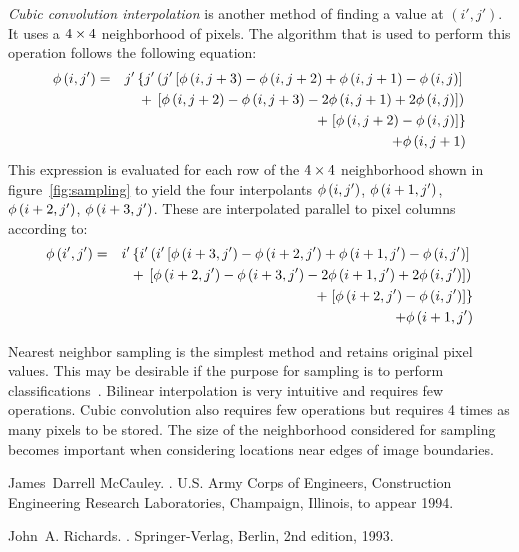 {\em Cubic convolution interpolation\/} is another method of finding
a value at $\left(i',j'\right).$ It uses a $4\times4\/$ neighborhood 
of pixels. The algorithm that is used to perform this
operation follows the following equation:
\begin{eqnarray}
\phi\left(i,j'\right) & = & j'\left\{j'\left(j'\left[\phi\left(i,j+3\right)-\phi\left(i,j+2\right)
                  + \phi\left(i,j+1\right)-\phi\left(i,j\right)\right]\right.\right.\\
                  \nonumber
            &   & + \left.\left.\left[\phi\left(i,j+2\right)-\phi\left(i,j+3\right)-2\phi\left(i,j+1\right)
                  + 2\phi\left(i,j\right)\right]\right)\right.\\
                  \nonumber
            &   & + \left.\left[\phi\left(i,j+2\right) - \phi\left(i,j\right)\right]\right\}\\
                  \nonumber
            &   & + \phi\left(i,j+1\right)
\end{eqnarray}
This expression is evaluated for each row of the $4\times4\/$ neighborhood
shown in figure~\ref{fig:sampling} to yield the four interpolants
$\phi\left(i,j'\right)$, $\phi\left(i+1,j'\right)$, $\phi\left(i+2,j'\right)$, $\phi\left(i+3,j'\right)$.
These are interpolated parallel to pixel columns according to:
\begin{eqnarray}
\phi\left(i',j'\right) & = & i'\left\{i'\left(i'\left[\phi\left(i+3,j'\right)-\phi\left(i+2,j'\right)
                  + \phi\left(i+1,j'\right)-\phi\left(i,j'\right)\right]\right.\right.\\
                  \nonumber
            &   & + \left.\left.\left[\phi\left(i+2,j'\right)-\phi\left(i+3,j'\right)-2\phi\left(i+1,j'\right)
                  + 2\phi\left(i,j'\right)\right]\right)\right.\\
                  \nonumber
            &   & + \left.\left[\phi\left(i+2,j'\right) - \phi\left(i,j'\right)\right]\right\}\\
                  \nonumber
            &   & + \phi\left(i+1,j'\right)
\end{eqnarray}

Nearest neighbor sampling is the simplest method and
retains original pixel values. This may be desirable if the
purpose for sampling is to perform
classifications~\cite{richards93}.  Bilinear interpolation
is very intuitive and requires few operations.  Cubic
convolution also requires few operations but requires 4
times as many pixels to be stored. The size of the
neighborhood considered for sampling becomes important when
considering locations near edges of image boundaries.

\begin{thebibliography}{1}
James~Darrell McCauley.
.
\newblock U.S. Army Corps of Engineers, Construction Engineering Research
  Laboratories, Champaign, Illinois, to appear 1994.
 
John~A. Richards.
.
\newblock Springer-Verlag, Berlin, 2nd edition, 1993.
 
\end{thebibliography}


